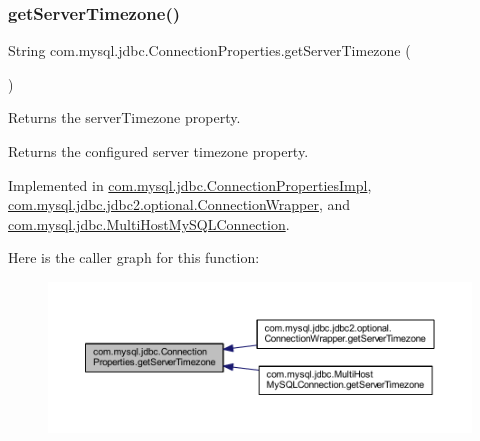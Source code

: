 \subsubsection{\texorpdfstring{get\+Server\+Timezone()}{getServerTimezone()}}
{\footnotesize\ttfamily String com.\+mysql.\+jdbc.\+Connection\+Properties.\+get\+Server\+Timezone (\begin{DoxyParamCaption}{ }\end{DoxyParamCaption})}

Returns the \textquotesingle{}server\+Timezone\textquotesingle{} property.

\begin{DoxyReturn}{Returns}
the configured server timezone property. 
\end{DoxyReturn}


Implemented in \mbox{\hyperlink{classcom_1_1mysql_1_1jdbc_1_1_connection_properties_impl_a7539092effc8c4091173c772afe7e1c4}{com.\+mysql.\+jdbc.\+Connection\+Properties\+Impl}}, \mbox{\hyperlink{classcom_1_1mysql_1_1jdbc_1_1jdbc2_1_1optional_1_1_connection_wrapper_a170059c98c792a038932db8bb5b0bd2b}{com.\+mysql.\+jdbc.\+jdbc2.\+optional.\+Connection\+Wrapper}}, and \mbox{\hyperlink{classcom_1_1mysql_1_1jdbc_1_1_multi_host_my_s_q_l_connection_a1aeab5021006a43eb885c10f945a747c}{com.\+mysql.\+jdbc.\+Multi\+Host\+My\+S\+Q\+L\+Connection}}.

Here is the caller graph for this function\+:\nopagebreak
\begin{figure}[H]
\begin{center}
\leavevmode
\includegraphics[width=350pt]{interfacecom_1_1mysql_1_1jdbc_1_1_connection_properties_a488c241668bba62e720eea31fde52512_icgraph}
\end{center}
\end{figure}
\mbox{\label{interfacecom_1_1mysql_1_1jdbc_1_1_connection_properties_ad63fb7021671197a1bdf1d314420a224}} 
